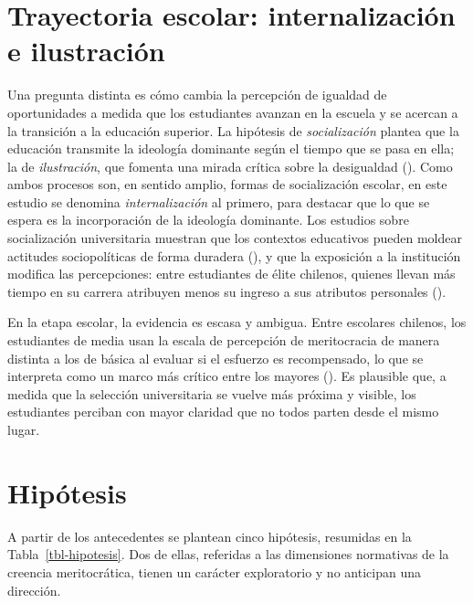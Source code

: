 \documentclass[
  spanish,
  a4paper,
  oneside]{scrbook}
\begin{document}
\section{Trayectoria escolar: internalización e
ilustración}\label{trayectoria-escolar-internalizaciuxf3n-e-ilustraciuxf3n}

Una pregunta distinta es cómo cambia la percepción de igualdad de
oportunidades a medida que los estudiantes avanzan en la escuela y se
acercan a la transición a la educación superior. La hipótesis de
\emph{socialización} plantea que la educación transmite la ideología
dominante según el tiempo que se pasa en ella; la de \emph{ilustración},
que fomenta una mirada crítica sobre la desigualdad
(). Como ambos
procesos son, en sentido amplio, formas de socialización escolar, en
este estudio se denomina \emph{internalización} al primero, para
destacar que lo que se espera es la incorporación de la ideología
dominante. Los estudios sobre socialización universitaria muestran que
los contextos educativos pueden moldear actitudes sociopolíticas de
forma duradera (), y que la exposición a la institución modifica las percepciones:
entre estudiantes de élite chilenos, quienes llevan más tiempo en su
carrera atribuyen menos su ingreso a sus atributos personales
().

En la etapa escolar, la evidencia es escasa y ambigua. Entre escolares
chilenos, los estudiantes de media usan la escala de percepción de
meritocracia de manera distinta a los de básica al evaluar si el
esfuerzo es recompensado, lo que se interpreta como un marco más crítico
entre los mayores (). Es plausible que, a medida que la selección universitaria se
vuelve más próxima y visible, los estudiantes perciban con mayor
claridad que no todos parten desde el mismo lugar.

\section{Hipótesis}\label{hipuxf3tesis}

A partir de los antecedentes se plantean cinco hipótesis, resumidas en
la Tabla~\ref{tbl-hipotesis}. Dos de ellas, referidas a las dimensiones
normativas de la creencia meritocrática, tienen un carácter exploratorio
y no anticipan una dirección.
\end{document}
